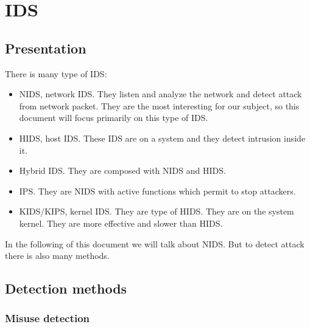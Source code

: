 
\chapter{IDS}

\section{Presentation}




There is many type of IDS:
\begin{itemize}
\item NIDS, network IDS. They listen and analyze the network and detect attack
  from network packet. They are the most interesting for our subject, so this
  document will focus primarily on this type of IDS.
\item HIDS, host IDS. These IDS are on a system and they detect intrusion inside
  it.
\item Hybrid IDS. They are composed with NIDS and HIDS.
\item IPS. They are NIDS with active functions which permit to stop attackers.
\item KIDS/KIPS, kernel IDS. They are type of HIDS. They are on the system
  kernel. They are more effective and slower than HIDS.
\end{itemize}

In the following of this document we will talk about NIDS. But to detect attack
there is also many methods.


\section{Detection methods}

\subsection{Misuse detection}

